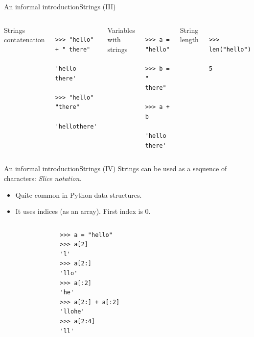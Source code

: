 \documentclass[10pt,compress]{beamer} %
\begin{document}
\begin{frame}[fragile]{An informal introduction}{Strings (III)}
\vspace{-0.4cm}
	\begin{columns}
		Strings contatenation
				\begin{block}{}
				\begin{verbatim}
				>>> "hello" + " there"
				'hello there'
				>>> "hello" "there"
				'hellothere'
				\end{verbatim}
				\end{block}

		Variables with strings
				\begin{block}{}
				\begin{verbatim}
				>>> a = "hello"
				>>> b = " there"
				>>> a + b
				'hello there'
				\end{verbatim}
				\end{block}

		String length
				\begin{block}{}
				\begin{verbatim}
				>>> len("hello")
				5
				\end{verbatim}
				\end{block}
		\end{columns}

\end{frame}

\begin{frame}[fragile]{An informal introduction}{Strings (IV)}
	\vspace{-0.2cm}
	Strings can be used as a sequence of characters: \textit{Slice notation}.
	\begin{itemize}
	\item Quite common in Python data structures.
	\item It uses indices (as an array). First index is $0$.
	\end{itemize}
	\vspace{-0.3cm}
	\begin{columns}
 	   			\column{.40\textwidth}
				\begin{block}{}
				\begin{verbatim}
				>>> a = "hello"
				>>> a[2]
				'l'
				>>> a[2:]
				'llo'
				>>> a[:2]
				'he'
				>>> a[2:] + a[:2]
				'llohe'
				>>> a[2:4]
				'll'
				\end{verbatim}
				\end{block}
		\end{columns}
\end{frame}
\end{document}
